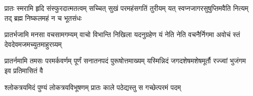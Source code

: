 
\fourlineindentedshloka
{प्रातः स्मरामि हृदि संस्फुरदात्मतत्वम्}
{सच्चित् सुखं परमहंसगतिं तुरीयम्}
{यत् स्वप्नजागरसुषुप्तिमवैति नित्यम्}
{तद् ब्रह्म निष्कलमहं न च भूतसंधः}
        
\fourlineindentedshloka
{प्रातर्भजामि मनसा वचसामगम्यम्}
{वाचो विभान्ति निखिला यदनुग्रहेण}
{यं नेति नेति वचनैर्निगमा अवोचं}
{स्तं देवदेवमजमच्युतमाहुरग्र्यम्}
            
\fourlineindentedshloka
{प्रातर्नमामि तमसः परमर्कवर्णम्}
{पूर्णं सनातनपदं पुरूषोत्तमाख्यम्}
{यस्मिन्निदं जगदशेषमशेषमूर्तौ}
{रज्ज्वां भुजंगम इव प्रतिमासितं वै}
            
\twolineshloka
{श्लोकत्रयमिदं पुण्यं लोकत्रयविभूषणम्}
{प्रातः काले पठेद्यस्तु स गच्छेत्परमं पदम्}
            
            
\closesection
